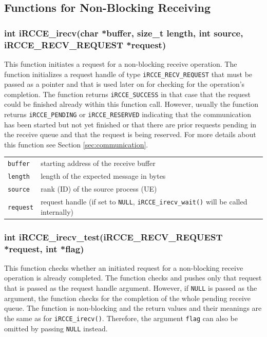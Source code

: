 \documentclass[fontsize=10pt, paper=a4, DIV12, pagesize=auto]{scrartcl}
\begin{document}
\subsection{Functions for Non-Blocking Receiving}

\subsubsection{int iRCCE\_irecv(char *buffer, size\_t length, int source, iRCCE\_RECV\_REQUEST *request)}\vspace{-0.3cm}
This function initiates a request for a non-blocking receive operation. The function initializes a request handle of type \texttt{iRCCE\_RECV\_REQUEST} that must be passed as a pointer and that is used later on for checking for the operation's completion.
The function returns \texttt{iRCCE\_SUCCESS} in that case that the request could be finished already within this function call.
However, usually the function returns \texttt{iRCCE\_PENDING} or \texttt{iRCCE\_RESERVED} indicating that the communication has been started but not yet finished or that there are prior requests pending in the receive queue and that the request is being reserved.
For more details about this function see Section \ref{sec:communication}.

\begin{tabular}{ll}
\texttt{buffer}  & starting address of the receive buffer \\
\texttt{length}  & length of the expected message in bytes \\
\texttt{source}  & rank (ID) of the source process (UE) \\
\texttt{request} & request handle (if set to \texttt{NULL}, \texttt{iRCCE\_irecv\_wait()} will be called internally)
\hspace{2.0cm}
\end{tabular}


\subsubsection{int iRCCE\_irecv\_test(iRCCE\_RECV\_REQUEST *request, int *flag)}\vspace{-0.3cm}
This function checks whether an initiated request for a non-blocking receive operation is already completed.
The function checks and pushes only that request that is passed as the request handle argument.
However, if \texttt{NULL} is passed as the argument, the function checks for the completion of the whole pending receive queue.
The function is non-blocking and the return values and their meanings are the same as for \texttt{iRCCE\_irecv()}.
Therefore, the argument \texttt{flag} can also be omitted by passing \texttt{NULL} instead.
\end{document}
